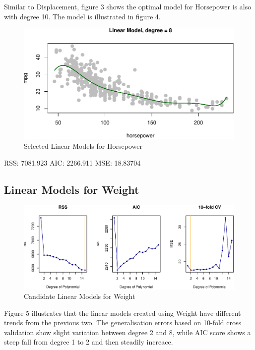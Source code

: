 \documentclass[]{article}
\begin{document}
Similar to Displacement, figure 3 shows the optimal model for Horsepower
is also with degree 10. The model is illustrated in figure 4.

\begin{figure}

{\centering \includegraphics{Report_files/figure-latex/lm-h-best-1} 

}

\caption{Selected Linear Models for Horsepower}\label{fig:lm-h-best}
\end{figure}

RSS: 7081.923 AIC: 2266.911 MSE: 18.83704

\hypertarget{linear-models-for-weight}{%
\subsection{Linear Models for Weight}\label{linear-models-for-weight}}

\begin{figure}

{\centering \includegraphics{Report_files/figure-latex/lm-w-1} 

}

\caption{Candidate Linear Models for Weight}\label{fig:lm-w}
\end{figure}

Figure 5 illustrates that the linear models created using Weight have
different trends from the previous two. The generalisation errors based
on 10-fold cross validation show slight variation between degree 2 and
8, while AIC score shows a steep fall from degree 1 to 2 and then
steadily increace.
\end{document}
